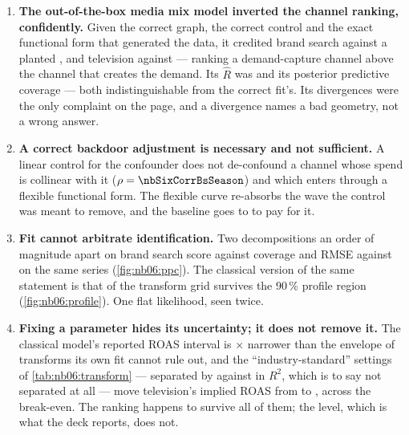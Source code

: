 \begin{enumerate}[leftmargin=*, itemsep=.45em]
  \item \textbf{The out-of-the-box media mix model inverted the channel ranking, confidently.}
        Given the correct graph, the correct control and the exact functional form that generated
        the data, it credited brand search \eur{\nbSixDefBs} against a planted \eur{\nbSixTrueBs},
        and television \eur{\nbSixDefTv} against \eur{\nbSixTrueTv} --- ranking a demand-capture
        channel above the channel that creates the demand. Its $\hat R$ was \nbSixDefRhat{} and its
        posterior predictive coverage \pc{\nbSixPpcCovDef} --- both indistinguishable from the
        correct fit's. Its \nbSixDefDiv{} divergences were the only complaint on the page, and a
        divergence names a bad geometry, not a wrong answer.

  \item \textbf{A correct backdoor adjustment is necessary and not sufficient.} A linear control
        for the confounder does not de-confound a channel whose spend is collinear with it
        ($\rho = \nbSixCorrBsSeason$) and which enters through a flexible functional form. The
        flexible curve re-absorbs the wave the control was meant to remove, and the baseline goes
        to \eur{\nbSixDefBaseline} to pay for it.

  \item \textbf{Fit cannot arbitrate identification.} Two decompositions an order of magnitude
        apart on brand search score \pc{\nbSixPpcCovDef} against \pc{\nbSixPpcCovCal} coverage and
        RMSE \nbSixPpcRmseDef{} against \nbSixPpcRmseCal{} on the same series
        (\cref{fig:nb06:ppc}). The classical version of the same statement is that
        \pc{\nbSixRegShare} of the transform grid survives the 90\,\% profile region
        (\cref{fig:nb06:profile}). One flat likelihood, seen twice.

  \item \textbf{Fixing a parameter hides its uncertainty; it does not remove it.} The classical
        model's reported ROAS interval is \nbSixEnvOverCi$\times$ narrower than the envelope of
        transforms its own fit cannot rule out, and the \nbSixAssertN{} ``industry-standard''
        settings of \cref{tab:nb06:transform} --- separated by \nbSixAssertRsqHi{} against
        \nbSixAssertRsqLo{} in $R^2$, which is to say not separated at all --- move television's
        implied ROAS from \nbSixAssertRoasTvLo{} to \nbSixAssertRoasTvHi, across the break-even.
        The ranking happens to survive all of them; the level, which is what the deck reports,
        does not.


\end{enumerate}
